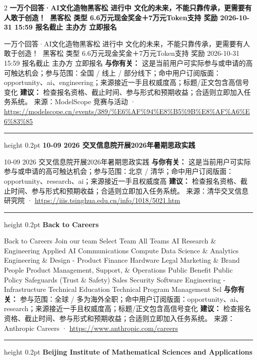 \documentclass[10.5pt]{ctexart}
\begin{document}
\begin{multicols}{2}
{\large\bfseries 一万个回答·AI文化造物黑客松 进行中 文化的未来，不能只靠传承，更需要有人敢于创造！👋 黑客松 类型 6.6万元现金奖金＋7万元Token支持 奖励 2026-10-31 15:59 报名截止 主办方 立即报名}\par
一万个回答·AI文化造物黑客松 进行中 文化的未来，不能只靠传承，更需要有人敢于创造！👋 黑客松 类型 6.6万元现金奖金＋7万元Token支持 奖励 2026-10-31 15:59 报名截止 主办方 立即报名
\textbf{与你有关：} 这是当前用户可实际参与或申请的高可触达机会；参与范围：全国 / 线上 / 部分线下；命中用户订阅版面：opportunity、ai、engineering；来源接近一手且权威度高；标题/正文包含高信号变化
\textbf{建议：} 检查报名资格、截止时间、参与形式和预期收益；合适则立即加入任务系统。
{\footnotesize\color{ormuted} 来源：ModelScope 竞赛与活动 · \url{https://modelscope.cn/events/389/%E6%AF%94%E8%B5%9B%E8%AF%A6%E6%83%85}}
\vspace{2mm}
\hrule height 0.2pt
\vspace{2mm}
{\large\bfseries 10-09 2026 交叉信息院开展2026年暑期思政实践}\par
10-09 2026 交叉信息院开展2026年暑期思政实践
\textbf{与你有关：} 这是当前用户可实际参与或申请的高可触达机会；参与范围：北京 / 清华；命中用户订阅版面：opportunity、research、ai；来源接近一手且权威度高
\textbf{建议：} 检查报名资格、截止时间、参与形式和预期收益；合适则立即加入任务系统。
{\footnotesize\color{ormuted} 来源：清华交叉信息研究院 · \url{https://iiis.tsinghua.edu.cn/info/1018/5021.htm}}
\vspace{2mm}
\hrule height 0.2pt
\vspace{2mm}
{\large\bfseries Back to Careers}\par
Back to Careers Join our team Select Team All Teams AI Research \& Engineering Applied AI Communications Compute Data Science \& Analytics Engineering \& Design - Product Finance Hardware Legal Marketing \& Brand People Product Management, Support, \& Operations Public Benefit Public Policy Safeguards (Trust \& Safety) Sales Security Software Engineering - Infrastructure Technical Education Technical Program Management Sel
\textbf{与你有关：} 参与范围：全球 / 多为海外全职；命中用户订阅版面：opportunity、ai、research；来源接近一手且权威度高；标题/正文包含高信号变化
\textbf{建议：} 检查报名资格、截止时间、参与形式和预期收益；合适则立即加入任务系统。
{\footnotesize\color{ormuted} 来源：Anthropic Careers · \url{https://www.anthropic.com/careers}}
\vspace{2mm}
\hrule height 0.2pt
\vspace{2mm}
{\large\bfseries Beijing Institute of Mathematical Sciences and Applications}\par

\end{multicols}
\end{document}
